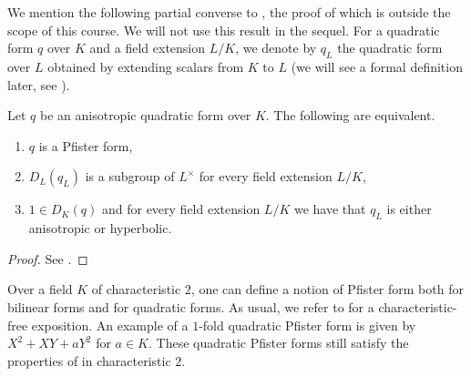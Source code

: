 \documentclass[12pt, leqno, british]{amsart}
\begin{document}
We mention the following partial converse to , the proof of which is outside the scope of this course.
We will not use this result in the sequel.
For a quadratic form $q$ over $K$ and a field extension $L/K$, we denote by $q_L$ the quadratic form over $L$ obtained by extending scalars from $K$ to $L$ (we will see a formal definition later, see ).
\begin{thm}[Pfister]\label{T:Pfister-characterisation}
Let $q$ be an anisotropic quadratic form over $K$.
The following are equivalent.
\begin{enumerate}
\item $q$ is a Pfister form,
\item $D_L(q_L)$ is a subgroup of $L^\times$ for every field extension $L/K$,
\item $1 \in D_K(q)$ and for every field extension $L/K$ we have that $q_L$ is either anisotropic or hyperbolic.
\end{enumerate}
\end{thm}
\begin{proof}
See \autocite[Theorem 23.2 and Corollary 23.4]{ElmanKarpenkoMerkurjev}.
\end{proof}
\begin{rem}
Over a field $K$ of characteristic $2$, one can define a notion of Pfister form both for bilinear forms and for quadratic forms.
As usual, we refer to \autocite[Sections 7 and 9]{ElmanKarpenkoMerkurjev} for a characteristic-free exposition.
An example of a $1$-fold quadratic Pfister form is given by $X^2 + XY + aY^2$ for $a \in K$.
These quadratic Pfister forms still satisfy the properties of  in characteristic $2$.
\end{rem}
\end{document}

